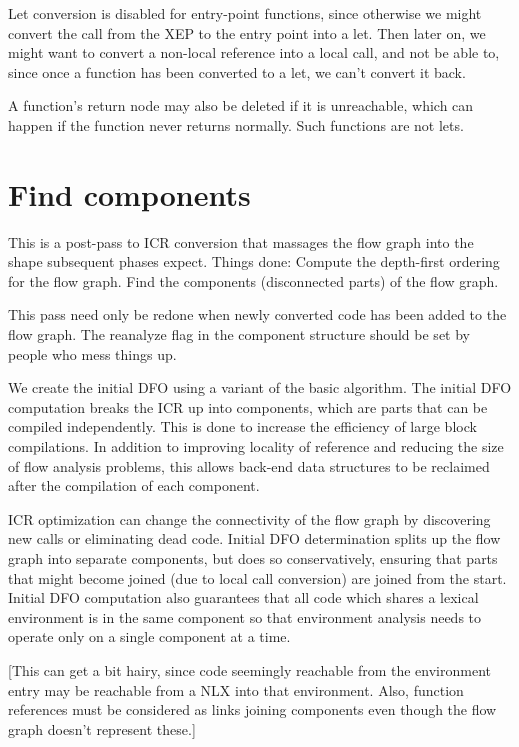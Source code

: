 Let conversion is disabled for entry-point functions, since otherwise we might
convert the call from the XEP to the entry point into a let.  Then later on, we
might want to convert a non-local reference into a local call, and not be able
to, since once a function has been converted to a let, we can't convert it
back.


A function's return node may also be deleted if it is unreachable, which can
happen if the function never returns normally.  Such functions are not lets.


\chapter{Find components}

This is a post-pass to ICR conversion that massages the flow graph into the
shape subsequent phases expect.  Things done:
  Compute the depth-first ordering for the flow graph.
  Find the components (disconnected parts) of the flow graph.

This pass need only be redone when newly converted code has been added to the
flow graph.  The reanalyze flag in the component structure should be set by
people who mess things up.

We create the initial DFO using a variant of the basic algorithm.  The initial
DFO computation breaks the ICR up into components, which are parts that can be
compiled independently.  This is done to increase the efficiency of large block
compilations.  In addition to improving locality of reference and reducing the
size of flow analysis problems, this allows back-end data structures to be
reclaimed after the compilation of each component.

ICR optimization can change the connectivity of the flow graph by discovering
new calls or eliminating dead code.  Initial DFO determination splits up the
flow graph into separate components, but does so conservatively, ensuring that
parts that might become joined (due to local call conversion) are joined from
the start.  Initial DFO computation also guarantees that all code which shares
a lexical environment is in the same component so that environment analysis
needs to operate only on a single component at a time.

[This can get a bit hairy, since code seemingly reachable from the
environment entry may be reachable from a NLX into that environment.  Also,
function references must be considered as links joining components even though
the flow graph doesn't represent these.]

